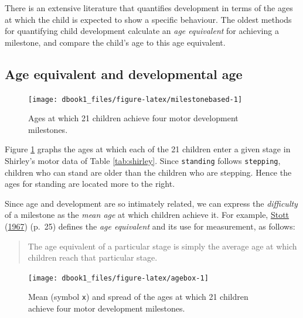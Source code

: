 \documentclass[
]{book}
\begin{document}
There is an extensive literature that quantifies development in terms of the ages at which the child is expected to show a specific behaviour. The oldest methods for quantifying child development calculate an \emph{age equivalent} for achieving a milestone, and compare the child's age to this age equivalent.

\hypertarget{sec:ageequivalent}{%
\subsection{Age equivalent and developmental age}\label{sec:ageequivalent}}

\begin{figure}

{\centering \texttt{[image: dbook1\_files/figure-latex/milestonebased-1]} 

}

\caption{Ages at which 21 children achieve four motor development milestones.}\label{fig:milestonebased}
\end{figure}



Figure \ref{fig:milestonebased} graphs the ages at which each of the 21 children enter a given stage in Shirley's motor data of Table \ref{tab:shirley}. Since \texttt{standing} follows \texttt{stepping}, children who can stand are older than the children who are stepping. Hence the ages for standing are located more to the right.

Since age and development are so intimately related, we can express the \emph{difficulty} of a milestone as the \emph{mean age} at which children achieve it. For example, \protect\hyperlink{ref-stott1967}{Stott} (\protect\hyperlink{ref-stott1967}{1967}) (p.~25) defines the \emph{age equivalent} and its use for measurement, as follows:

\begin{quote}
The age equivalent of a particular stage is simply the average age at which children reach that particular stage.
\end{quote}

\begin{figure}

{\centering \texttt{[image: dbook1\_files/figure-latex/agebox-1]} 

}

\caption{Mean (symbol \texttt{x}) and spread of the ages at which 21 children achieve four motor development milestones.}\label{fig:agebox}
\end{figure}
\end{document}
